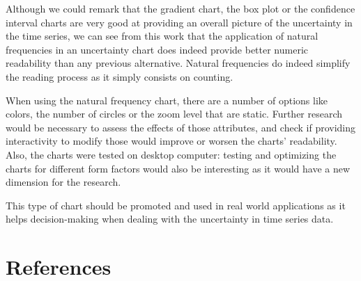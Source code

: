 \documentclass[a4paper,3p,sort&compress]{elsarticle}
\begin{document}
Although we could remark that the gradient chart, the box plot or the confidence interval charts are very good at 
providing an overall picture of the uncertainty in the time series, we can see from this work that the application of natural 
frequencies in an uncertainty chart does indeed
provide better numeric readability than any previous alternative. Natural frequencies do indeed simplify 
the reading process as it simply consists on counting.

When using the natural frequency chart, there are a number of options like colors, the number of circles or the 
zoom level that are static. Further research would be necessary to assess the effects of those 
attributes, and check if providing interactivity to modify those would improve or worsen the charts' readability. 
Also, the charts were tested on desktop computer: testing and optimizing the charts for different form factors
would also be interesting as it would have a new dimension for the research.

This type of chart should be promoted and used in real world applications as it helps decision-making when 
dealing with the uncertainty in time series data. 

\section{References}
\label{sec:ref}



\end{document}
